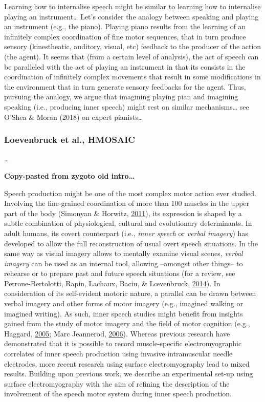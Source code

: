 \documentclass[a4paper,12pt,twoside,openright,oldfontcommands]{memoir}
\begin{document}
Learning how to internalise speech might be similar to learning how to
internalise playing an instrument\ldots{} Let's consider the analogy
between speaking and playing an instrument (e.g., the piano). Playing
piano results from the learning of an infinitely complex coordination of
fine motor sequences, that in turn produce sensory (kinestheatic,
auditory, visual, etc) feedback to the producer of the action (the
agent). It seems that (from a certain level of analysis), the act of
speech can be paralleled with the act of playing an instrument in that
its consists in the coordination of infinitely complex movements that
result in some modifications in the environment that in turn generate
sensory feedbacks for the agent. Thus, pursuing the analogy, we argue
that imagining playing pian and imagining speaking (i.e., producing
inner speech) might rest on similar mechanisms\ldots{} see O'Shea \&
Moran (2018) on expert pianists\ldots{}

\subsubsection{Loevenbruck et al.,
HMOSAIC}\label{loevenbruck-et-al.-hmosaic}

\ldots{}

\textbf{Copy-pasted from zygoto old intro\ldots{}}

Speech production might be one of the most complex motor action ever
studied. Involving the fine-grained coordination of more than 100
muscles in the upper part of the body (Simonyan \& Horwitz,
\protect\hyperlink{ref-simonyan_laryngeal_2011}{2011}), its expression
is shaped by a subtle combination of physiological, cultural and
evolutionary determinants. In adult humans, its covert counterpart
(i.e., \emph{inner speech} or \emph{verbal imagery}) has developed to
allow the full reconstruction of usual overt speech situations. In the
same way as visual imagery allows to mentally examine visual scenes,
\emph{verbal imagery} can be used as an internal tool, allowing
--amongst other things-- to rehearse or to prepare past and future
speech situations (for a review, see Perrone-Bertolotti, Rapin, Lachaux,
Baciu, \& Lœvenbruck,
\protect\hyperlink{ref-Perrone-Bertolotti2014}{2014}). In consideration
of its self-evident motoric nature, a parallel can be drawn between
verbal imagery and other forms of motor imagery (e.g., imagined walking
or imagined writing). As such, inner speech studies might benefit from
insights gained from the study of motor imagery and the field of motor
cognition (e.g., Haggard,
\protect\hyperlink{ref-haggard_conscious_2005}{2005}; Marc Jeannerod,
\protect\hyperlink{ref-jeannerod_motor_2006}{2006}). Whereas previous
research have demonstrated that it is possible to record muscle-specific
electromyographic correlates of inner speech production using invasive
intramuscular needle electrodes, more recent research using surface
electromyography lead to mixed results. Building upon previous work, we
describe an experimental set-up using surface electromyography with the
aim of refining the description of the involvement of the speech motor
system during inner speech production.
\end{document}
